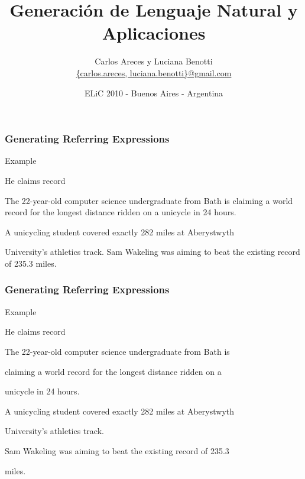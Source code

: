 \documentclass[compress,color=usenames]{beamer}
\title[GLN y Aplicaciones]{\Huge Generaci\'on de Lenguaje Natural y Aplicaciones}
\author[Areces \& Benotti]{
 Carlos Areces y Luciana Benotti\\[1ex]
\normalsize \url{{carlos.areces, luciana.benotti}@gmail.com}}
\institute[INRIA / UNC]{
INRIA Nancy Grand Est, Nancy, France\\
Universidad Nacional de C\'ordoba, C\'ordoba, Argentina}
\date{ELiC 2010 - Buenos Aires - Argentina}
\begin{document}
\beamerdefaultoverlayspecification{}


\begin{frame}[plain]
 \titlepage
\end{frame}


\begin{frame}
\frametitle{Generating Referring Expressions}


Example



He claims record

The 22-year-old computer science undergraduate from Bath is
claiming a world record for the longest distance ridden on a
unicycle in 24 hours.


A unicycling student covered exactly 282 miles at Aberystwyth



University's athletics track.
Sam Wakeling was aiming to beat the existing record of 235.3
miles.


\end{frame}




\begin{frame}
\frametitle{Generating Referring Expressions}






Example



He claims record



The 22-year-old computer science undergraduate from Bath is



claiming a world record for the longest distance ridden on a



unicycle in 24 hours.



A unicycling student covered exactly 282 miles at Aberystwyth



University's athletics track.



Sam Wakeling was aiming to beat the existing record of 235.3



miles.


\end{frame}
\end{document}
